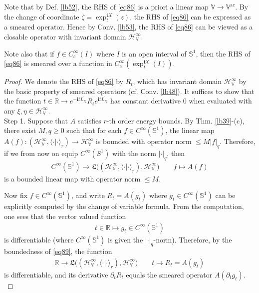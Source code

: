 \documentclass[12pt,b5paper,notitlepage]{article}
\theoremstyle{definition}
\theoremstyle{plain}
\newcommand{\fk}{\mathfrak}
\newcommand{\ovl}{\overline}
\newcommand{\bk}[1]{\langle {#1}\rangle}
\newcommand{\im}{\mathbf{i}}
\newcommand{\Vbb}{\mathbb V}
\newcommand{\Rbb}{\mathbb R}
\newcommand{\Sbb}{{\mathbb S}}
\newcommand{\HV}{\mathcal H_{\mathbb V}}
\newcommand{\ac}{\mathrm{ac}}
\numberwithin{equation}{section}
\begin{document}
Note that by Def. \ref{lb52}, the RHS of \eqref{eq86} is a priori a linear map $\Vbb\rightarrow\Vbb^\ac$. By the change of coordinate $\zeta=\exp^{\im X}_t(z)$, the RHS of \eqref{eq86} can be expressed as a smeared operator. Hence by Conv. \ref{lb53}, the  RHS of \eqref{eq86} can be viewed as a closable operator with invariant domain $\HV^\infty$.

Note also that if $f\in C_c^\infty(I)$ where $I$ is an open interval of $\Sbb^1$, then the RHS of \eqref{eq86} is smeared over a function in $C_c^\infty(\exp_t^{\im X}(I))$. 

\begin{proof}
We denote the RHS of \eqref{eq86} by $R_t$, which has invariant domain $\HV^\infty$ by the basic property of smeared operators (cf. Conv. \ref{lb48}). It suffices to show that the function $t\in\Rbb\rightarrow e^{-\im t\ovl{L_X}} R_te^{\im t\ovl{L_X}}$ has constant derivative $0$ when evaluated with any $\xi,\eta\in\HV^\infty$.\\[-1ex]




Step 1. Suppose that $A$ satisfies $r$-th order energy bounds. By Thm. \ref{lb39}-(c), there exist $M,q\geq0$ such that for each $f\in C^\infty(\Sbb^1)$, the linear map $A(f):(\HV^\infty,\bk{\cdot|\cdot}_r)\rightarrow\HV^\infty$ is bounded with operator norm $\leq M|f|_q$. Therefore, if we from now on equip $C^\infty(S^1)$ with the norm $|\cdot|_q$, then
\begin{gather}\label{eq89}
C^\infty(\Sbb^1)\rightarrow\fk L\big((\HV^\infty,\bk{\cdot|\cdot}_r),\HV^\infty\big)\qquad f\mapsto A(f)
\end{gather}
is a bounded linear map with operator norm $\leq M$.

Now fix $f\in C^\infty(\Sbb^1)$, and write $R_t=A(g_t)$ where $g_t\in C^\infty(\Sbb^1)$ can be explicitly computed by the change of variable formula. From the computation, one sees that the vector valued function
\begin{align*}
t\in\Rbb\mapsto g_t\in C^\infty(\Sbb^1)
\end{align*}
is differentiable (where $C^\infty(\Sbb^1)$ is given the $|\cdot|_q$-norm). Therefore, by the boundedness of \eqref{eq89}, the function
\begin{align*}
\Rbb\rightarrow\fk L\big((\HV^\infty,\bk{\cdot|\cdot}_r),\HV^\infty\big) \tag{a}\qquad t\mapsto R_t=A(g_t)\label{eq88}
\end{align*}
is differentiable, and its derivative $\partial_tR_t$ equals the smeared operator $A(\partial_tg_t)$.\\[-1ex]




\end{proof}
\end{document}
